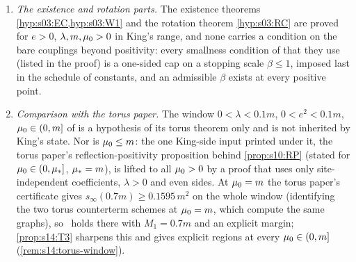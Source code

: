 \begin{lemma}
\begin{enumerate}[label=\textup{(\alph*)},leftmargin=*]
\begin{enumerate}[label=\textup{(\roman*)},nosep,leftmargin=*]
\item To one-loop order, for every $M_1>0$,
\[
s_\infty(M_1)=\tfrac12(m^2-M_1^2)+\frac{\lambda(N+2)(m-M_1)}{2\pi}-e^2\,\frac{(m-M_1)\,(m\lmu+mM_1+M_1\lmu)}{8\pi(\lmu+M_1)(m+\lmu)},
\]
so that
\begin{equation}\label{eq:s14:alphaprime}
\alpha'_\infty(m)=1+\frac{\lambda(N+2)}{2\pi m}-e^2\,\frac{m+2\lmu}{8\pi(m+\lmu)^2},\qquad \frac{m+2\lmu}{8\pi(m+\lmu)^2}\le\frac1{4\pi(m+\lmu)},
\end{equation}
and to one-loop order \Tthree\ holds if and only if
\begin{equation}\label{eq:s14:ec2}
e^2<e_c^2(\lambda,m,\lmu)\defeq\max\Big\{\frac{8\pi(m+\lmu)^2}{m+2\lmu}\Big(1+\frac{\lambda(N+2)}{2\pi m}\Big),\ 4\pi(m+\lmu)\Big(1+\frac{\lambda(N+2)}{\pi m}\Big)\Big\},
\end{equation}
the first entry being the larger if and only if $\lambda(N+2)\lmu\le\pi m^2$. So the one-loop failure set of \Tthree\ is the half-line $e^2\ge e_c^2$. The first entry is the zero $e_*^2\ge4\pi(m+\lmu)$ of \eqref{eq:s14:alphaprime}; at $m=\lmu=1$, $\lambda=0$ it equals $32\pi/3\approx33.5$ (for orientation only). Nothing finer than one-loop order is claimed about $E^<_W$.
\item For the two-sided set, $E_W\subset\{\alpha'_\infty(m)=0\}$; for each $(\lambda,m,\lmu)$ at which the polynomial $e^2\mapsto\alpha'_\infty(m)$, of degree $\le2$, is not identically zero, this is at most two values of $e^2$. At $\lmu=m$ the window $0<\lambda,e^2<0.1m$ of the torus paper \cite{SymPhase} lies outside $E^<_W$, by (d).
\end{enumerate}
\item \emph{The existence and rotation parts.} The existence theorems \cref{hyp:s03:EC,hyp:s03:W1} and the rotation theorem \cref{hyp:s03:RC} are proved for $e>0$, $\lambda,m,\mu_0>0$ in King's range, and none carries a condition on the bare couplings beyond positivity: every smallness condition of \cite{Ba1,Ba2,Ba3,Ba4} that they use (listed in the proof) is a one-sided cap on a stopping scale $\beta\le1$, imposed last in the schedule of constants, and an admissible $\beta$ exists at every positive point.\item \emph{Comparison with the torus paper.} The window $0<\lambda<0.1m$, $0<e^2<0.1m$, $\mu_0\in(0,m]$ of \cite{SymPhase} is a hypothesis of its torus theorem only and is not inherited by King's state. Nor is $\mu_0\le m$: the one King-side input printed under it, the torus paper's reflection-positivity proposition behind \cref{prop:s10:RP} (stated for $\mu_0\in(0,\mu_*]$, $\mu_*=m$), is lifted to all $\mu_0>0$ by a proof that uses only site-independent coefficients, $\lambda>0$ and even sides. At $\lmu=m$ the torus paper's certificate gives $s_\infty(0.7m)\ge0.1595\,m^2$ on the whole window (identifying the two torus counterterm schemes at $\lmu=m$, which compute the same graphs), so \Tthree\ holds there with $M_1=0.7m$ and an explicit margin; \cref{prop:s14:T3} sharpens this and gives explicit regions at every $\mu_0\in(0,m]$ (\cref{rem:s14:torus-window}).

\end{enumerate}
\end{lemma}

